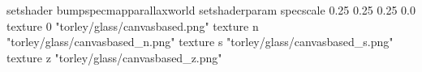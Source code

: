 setshader bumpspecmapparallaxworld
setshaderparam specscale 0.25 0.25 0.25 0.0
texture 0 "torley/glass/canvasbased.png"
texture n "torley/glass/canvasbased_n.png"
texture s "torley/glass/canvasbased_s.png"
texture z "torley/glass/canvasbased_z.png"

